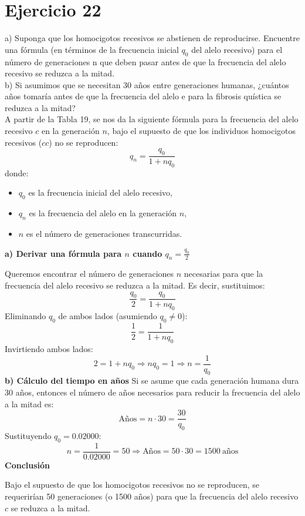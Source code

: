 \documentclass{article}
\begin{document}
\section{Ejercicio 22}
a) Suponga que los homocigotos recesivos se abstienen de reproducirse. Encuentre una fórmula (en términos de la frecuencia inicial $q_0$ del alelo recesivo) para el número de generaciones n que deben pasar antes de que la frecuencia del alelo recesivo se reduzca a la mitad.\\
b) Si asumimos que se necesitan 30 años entre generaciones humanas, ¿cuántos años tomaría antes de que la frecuencia del alelo e para la fibrosis quística se reduzca a la mitad?\\

A partir de la Tabla 19, se nos da la siguiente fórmula para la frecuencia del alelo recesivo \( c \) en la generación \( n \), bajo el supuesto de que los individuos homocigotos recesivos (\( cc \)) no se reproducen:
\[q_n = \frac{q_0}{1 + n q_0}\]
donde:
\begin{itemize}
    \item \( q_0 \) es la frecuencia inicial del alelo recesivo,
    \item \( q_n \) es la frecuencia del alelo en la generación \( n \),
    \item \( n \) es el número de generaciones transcurridas.
\end{itemize}
\textbf{a) Derivar una fórmula para \( n \) cuando \( q_n = \frac{q_0}{2} \)}

Queremos encontrar el número de generaciones \( n \) necesarias para que la frecuencia del alelo recesivo se reduzca a la mitad. Es decir, sustituimos:
\[\frac{q_0}{2} = \frac{q_0}{1 + n q_0}\]
Eliminando \( q_0 \) de ambos lados (asumiendo \( q_0 \ne 0 \)):
\[\frac{1}{2} = \frac{1}{1 + n q_0}\]
Invirtiendo ambos lados:
\[2 = 1 + n q_0\Rightarrow n q_0 = 1\Rightarrow \boxed{n = \frac{1}{q_0}}\]
\textbf{b) Cálculo del tiempo en años}
Si se asume que cada generación humana dura 30 años, entonces el número de años necesarios para reducir la frecuencia del alelo a la mitad es:
\[\text{Años} = n \cdot 30 = \frac{30}{q_0}\]
Sustituyendo \( q_0 = 0.02000 \):
\[n = \frac{1}{0.02000} = 50
\Rightarrow \text{Años} = 50 \cdot 30 = \boxed{1500\ \text{años}}\]
\textbf{Conclusión}

Bajo el supuesto de que los homocigotos recesivos no se reproducen, se requerirían 50 generaciones (o 1500 años) para que la frecuencia del alelo recesivo \( c \) se reduzca a la mitad.
\end{document}
